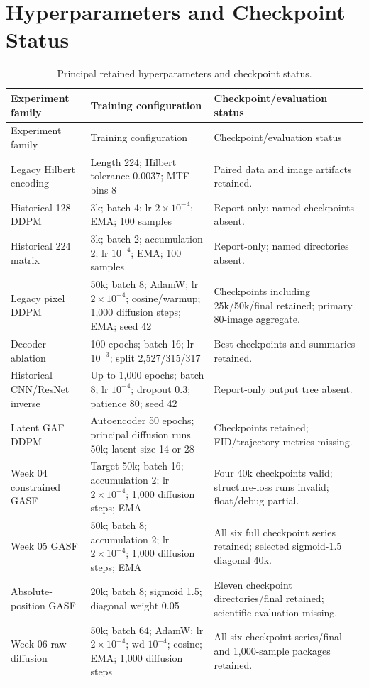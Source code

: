 \documentclass[12pt,a4paper,oneside]{report}
\begin{document}
\chapter{Hyperparameters and Checkpoint Status}
\label{app:hyperparameters}

\begin{longtable}{L{0.23\textwidth}L{0.29\textwidth}L{0.39\textwidth}}
\caption{Principal retained hyperparameters and checkpoint status.}\label{tab:hyperparameters}\\
\toprule
Experiment family & Training configuration & Checkpoint/evaluation status \\
\midrule
\endfirsthead
\toprule
Experiment family & Training configuration & Checkpoint/evaluation status \\
\midrule
\endhead
Legacy Hilbert encoding & Length 224; Hilbert tolerance 0.0037; MTF bins 8 & Paired data and image artifacts retained. \\
Historical 128 DDPM & 3k; batch 4; lr $2\times10^{-4}$; EMA; 100 samples & Report-only; named checkpoints absent. \\
Historical 224 matrix & 3k; batch 2; accumulation 2; lr $10^{-4}$; EMA; 100 samples & Report-only; named directories absent. \\
Legacy pixel DDPM & 50k; batch 8; AdamW; lr $2\times10^{-4}$; cosine/warmup; 1,000 diffusion steps; EMA; seed 42 & Checkpoints including 25k/50k/final retained; primary 80-image aggregate. \\
Decoder ablation & 100 epochs; batch 16; lr $10^{-3}$; split 2,527/315/317 & Best checkpoints and summaries retained. \\
Historical CNN/ResNet inverse & Up to 1,000 epochs; batch 8; lr $10^{-4}$; dropout 0.3; patience 80; seed 42 & Report-only output tree absent. \\
Latent GAF DDPM & Autoencoder 50 epochs; principal diffusion runs 50k; latent size 14 or 28 & Checkpoints retained; FID/trajectory metrics missing. \\
Week 04 constrained GASF & Target 50k; batch 16; accumulation 2; lr $2\times10^{-4}$; 1,000 diffusion steps; EMA & Four 40k checkpoints valid; structure-loss runs invalid; float/debug partial. \\
Week 05 GASF & 50k; batch 8; accumulation 2; lr $2\times10^{-4}$; 1,000 diffusion steps; EMA & All six full checkpoint series retained; selected sigmoid-1.5 diagonal 40k. \\
Absolute-position GASF & 20k; batch 8; sigmoid 1.5; diagonal weight 0.05 & Eleven checkpoint directories/final retained; scientific evaluation missing. \\
Week 06 raw diffusion & 50k; batch 64; AdamW; lr $2\times10^{-4}$; wd $10^{-4}$; cosine; EMA; 1,000 diffusion steps & All six checkpoint series/final and 1,000-sample packages retained. \\
\bottomrule
\end{longtable}
\end{document}
